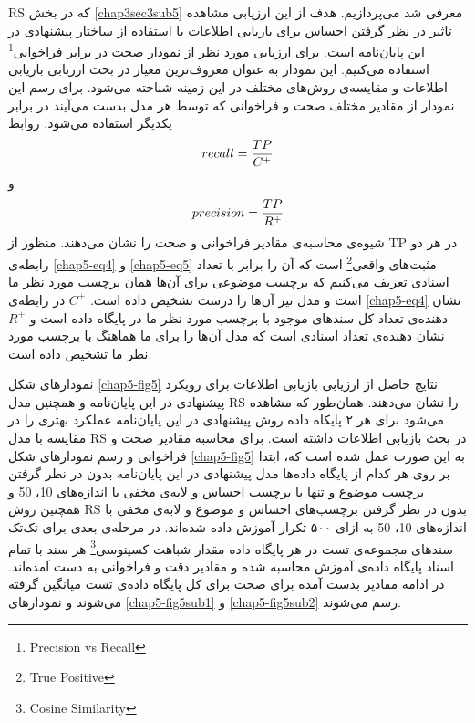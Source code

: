 RS
که در بخش
\ref{chap3sec3sub5}
معرفی‌ شد می‌‌پردازیم. هدف از این ارزیابی مشاهده تاثیر در نظر گرفتن احساس برای بازیابی اطلاعات با استفاده از ساختار پیشنهادی در این پایان‌‌نامه است. برای ارزیابی مورد نظر از نمودار صحت در برابر فراخوانی\footnote{Precision vs Recall}
استفاده می‌‌کنیم. این نمودار به عنوان معروف‌ترین معیار در بحث ارزیابی بازیابی اطلاعات و مقایسه‌ی روش‌های مختلف در این زمینه شناخته می‌‌شود. برای رسم این نمودار از مقادیر مختلف صحت و فراخوانی که توسط هر مدل بدست می‌‌آیند در برابر یکدیگر استفاده می‌‌شود. روابط
\begin{align}
	\centering
	\label{chap5-eq4}
	recall = \dfrac{TP}{C^+}
\end{align}
و
\begin{align}
	\centering
	\label{chap5-eq5}
	precision = \dfrac{TP}{R^+}
\end{align}
شیوه‌ی محاسبه‌ی مقادیر فراخوانی و صحت را نشان می‌‌دهند. منظور از
TP
در هر دو رابطه‌ی
\ref{chap5-eq4}
و
\ref{chap5-eq5}
مثبت‌های واقعی‌\footnote{True Positive}
 است که آن را برابر با تعداد اسنادی تعریف می‌‌کنیم که برچسب موضوعی برای آن‌ها همان برچسب مورد نظر ما است و مدل نیز آن‌ها را 
درست تشخیص داده است.
$C^+$
در رابطه‌ی
\ref{chap5-eq4}
نشان دهنده‌ی تعداد کل سندهای موجود با برچسب مورد نظر ما در پایگاه داده است و
$R^+$
نشان دهنده‌ی تعداد اسنادی است که مدل آن‌ها را برای ما هماهنگ با برچسب مورد نظر ما تشخیص داده است.


نمودار‌های شکل
\ref{chap5-fig5}
نتایج حاصل از ارزیابی بازیابی اطلاعات برای رویکرد پیشنهادی در این پایان‌نامه و همچنین مدل
RS
را نشان می‌‌دهند. همان‌طور که مشاهده می‌‌شود برای هر ۲ پایکاه داده روش پیشنهادی در این پایان‌نامه عملکرد بهتری را در مقایسه با مدل
RS
در بحث بازیابی اطلاعات داشته است. برای محاسبه مقادیر صحت و فراخوانی و رسم نمودار‌های شکل
\ref{chap5-fig5}
به این صورت عمل شده است که، ابتدا بر روی هر کدام از پایگاه داده‌ها مدل پیشنهادی در این پایان‌نامه بدون در نظر گرفتن برچسب موضوع و تنها با برچسب احساس و لایه‌ی مخفی با انداز‌ه‌های 10، 50 و همچنین روش
RS
بدون در نظر گرفتن برچسب‌های احساس و موضوع و لابه‌ی مخفی با اندازه‌های 10، 50 به ازای ۵۰۰ تکرار آموزش داده شده‌اند. در مرحله‌ی بعدی برای تک‌تک سند‌های مجموعه‌ی تست در هر پایگاه داده مقدار شباهت کسینوسی\footnote{Cosine Similarity}
هر سند با تمام اسناد پایگاه داده‌ی آموزش محاسبه شده و مقادیر دقت و فراخوانی به دست آمده‌اند. در ادامه مقادیر بدست آمده برای صحت برای کل پایگاه داده‌ی تست میانگین گرفته می‌‌شوند و نمودار‌های
\ref{chap5-fig5sub1}
و
\ref{chap5-fig5sub2}
رسم می‌‌شوند.

